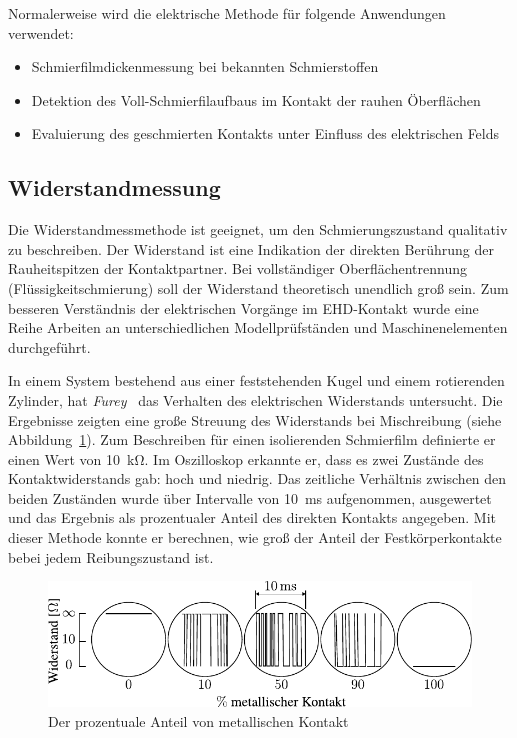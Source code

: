 Normalerweise wird die elektrische Methode für folgende Anwendungen verwendet:


\begin{itemize}
    \item Schmierfilmdickenmessung bei bekannten Schmierstoffen
    \item Detektion des Voll-Schmierfilaufbaus im Kontakt der rauhen Öberflächen
    \item Evaluierung des geschmierten Kontakts unter Einfluss des elektrischen Felds
\end{itemize}

\subsection{Widerstandmessung}
\label{sub:wiederstandmessung}

Die Widerstandmessmethode ist geeignet, um den Schmierungszustand qualitativ zu beschreiben.
Der Widerstand ist eine Indikation der direkten Berührung der Rauheitspitzen der Kontaktpartner.
Bei vollständiger Oberflächentrennung (Flüssigkeitschmierung) soll der Widerstand theoretisch unendlich groß sein.
Zum besseren Verständnis der elektrischen Vorgänge im EHD-Kontakt wurde eine Reihe Arbeiten an unterschiedlichen Modellprüfständen und Maschinenelementen durchgeführt.

In einem System bestehend aus einer feststehenden Kugel und einem rotierenden Zylinder, hat \textit{Furey}~\cite{furey_1961} das Verhalten des elektrischen Widerstands untersucht.
Die Ergebnisse zeigten eine große Streuung des Widerstands bei Mischreibung (siehe Abbildung~\ref{fig:resistance_vs_time_furey}).
Zum Beschreiben für einen isolierenden Schmierfilm definierte er einen Wert von \SI{10}{\kilo\ohm}.
Im Oszilloskop erkannte er, dass es zwei Zustände des Kontaktwiderstands gab: hoch und niedrig.
Das zeitliche Verhältnis zwischen den beiden Zuständen wurde über Intervalle von \SI{10}{\milli\second} aufgenommen, ausgewertet und das Ergebnis als prozentualer Anteil des direkten Kontakts angegeben.
Mit dieser Methode konnte er berechnen, wie groß der Anteil der Festkörperkontakte bebei jedem Reibungszustand ist.

\begin{figure}[htb]
    \centering
    \includegraphics[]{./images/resistance_vs_time_furey.pdf}
    \caption{Der prozentuale Anteil von metallischen Kontakt~\cite{furey_1961}}
    \label{fig:resistance_vs_time_furey}
\end{figure}

